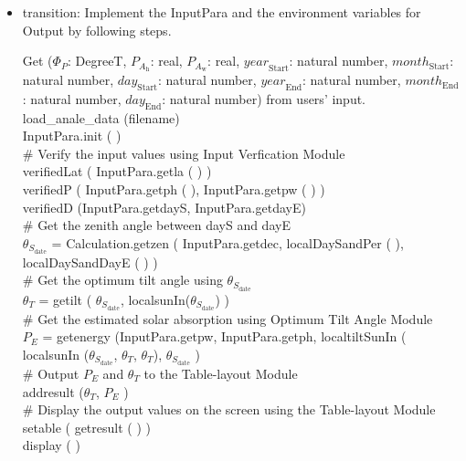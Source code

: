\documentclass[12pt, titlepage]{article}
\begin{document}
\begin{itemize}
\item transition: Implement the InputPara and  the environment variables for Output by following steps.

Get ($\Phi_P$: DegreeT, $P_{A_{\text{h}}}$: real, $P_{A_{\text{w}}}$: real, $\mathit{year}_\text{Start}$: natural number, $\mathit{month}_\text{Start}$: natural number, $\mathit{day}_\text{Start}$: natural number, $\mathit{year}_\text{End}$: natural number, $\mathit{month}_\text{End}$: natural number, $\mathit{day}_\text{End}$: natural number) from users' input.\\


load\_anale\_data (filename)\\
InputPara.init ( )\\

$\#$ Verify the input values using Input Verfication Module\\
verifiedLat ( InputPara.getla ( ) )\\
verifiedP ( InputPara.getph ( ), InputPara.getpw ( ) )\\
verifiedD (InputPara.getdayS, InputPara.getdayE)\\

$\#$ Get the zenith angle between dayS and
dayE\\


$\theta_{S_{\text{date}}}$ = Calculation.getzen ( InputPara.getdec,   localDaySandPer ( ),  localDaySandDayE ( ) )\\

$\#$ Get the optimum tilt angle using $\theta_{S_{\text{date}}}$\\
$\theta_{T}$ = getilt ( $\theta_{S_{\text{date}}}$, localsunIn($\theta_{S_{\text{date}}}$) )\\


$\#$ Get the estimated solar absorption using Optimum Tilt Angle Module\\

$P_{E}$ = getenergy (InputPara.getpw, InputPara.getph, localtiltSunIn ( localsunIn ($\theta_{S_{\text{date}}}$, $\theta_{T}$, $\theta_{T}$), $\theta_{S_{\text{date}}}$ )\\

$\#$ Output $P_{E}$ and $\theta_{T}$ to the Table-layout Module\\
addresult ($\theta_{T}$, $P_{E}$ )\\

$\#$ Display the output values on the screen using the Table-layout Module\\
setable ( getresult ( ) )\\
display ( )

\end{itemize}
\end{document}
